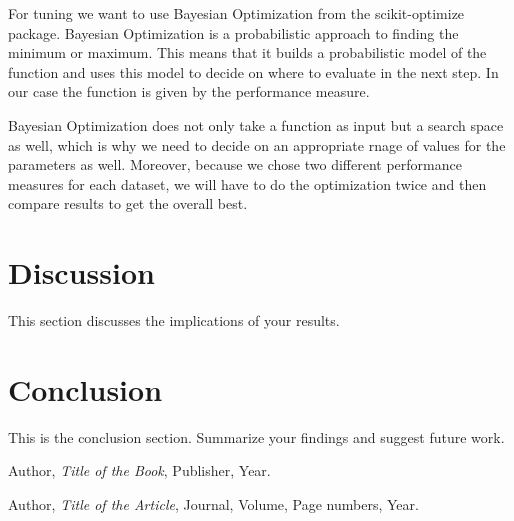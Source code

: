 \documentclass[a4paper,12pt]{article}
\begin{document}
For tuning we want to use Bayesian Optimization from the scikit-optimize package. Bayesian Optimization is a probabilistic approach to finding the minimum or maximum. This means that it builds a probabilistic model of the function and uses this model to decide on where to evaluate in the next step. In our case the function is given by the performance measure. 

Bayesian Optimization does not only take a function as input but a search space as well, which is why we need to decide on an appropriate rnage of values for the parameters as well. Moreover, because we chose two different performance measures for each dataset, we will have to do the optimization twice and then compare results to get the overall best.





\section{Discussion}
This section discusses the implications of your results.

\section{Conclusion}
This is the conclusion section. Summarize your findings and suggest future work.

\begin{thebibliography}{9}
Author, \textit{Title of the Book}, Publisher, Year.

Author, \textit{Title of the Article}, Journal, Volume, Page numbers, Year.
\end{thebibliography}
\end{document}
